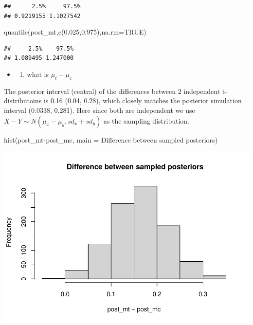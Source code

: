 \documentclass[
]{book}
\newenvironment{Shaded}{\begin{snugshade}}{\end{snugshade}}
\newcommand{\AttributeTok}[1]{\textcolor[rgb]{0.77,0.63,0.00}{#1}}
\newcommand{\ConstantTok}[1]{\textcolor[rgb]{0.00,0.00,0.00}{#1}}
\newcommand{\FloatTok}[1]{\textcolor[rgb]{0.00,0.00,0.81}{#1}}
\newcommand{\FunctionTok}[1]{\textcolor[rgb]{0.00,0.00,0.00}{#1}}
\newcommand{\NormalTok}[1]{#1}
\newcommand{\SpecialCharTok}[1]{\textcolor[rgb]{0.00,0.00,0.00}{#1}}
\newcommand{\StringTok}[1]{\textcolor[rgb]{0.31,0.60,0.02}{#1}}
\providecommand{\tightlist}{%
  \setlength{\itemsep}{0pt}\setlength{\parskip}{0pt}}
\theoremstyle{definition}
\theoremstyle{definition}
\theoremstyle{definition}
\theoremstyle{definition}
\theoremstyle{remark}
\begin{document}
\begin{verbatim}
##      2.5%     97.5% 
## 0.9219155 1.1027542
\end{verbatim}

\begin{Shaded}
\begin{Highlighting}[]
        \FunctionTok{quantile}\NormalTok{(post\_mt,}\FunctionTok{c}\NormalTok{(}\FloatTok{0.025}\NormalTok{,}\FloatTok{0.975}\NormalTok{),}\AttributeTok{na.rm=}\ConstantTok{TRUE}\NormalTok{)}
\end{Highlighting}
\end{Shaded}

\begin{verbatim}
##     2.5%    97.5% 
## 1.089495 1.247000
\end{verbatim}

\begin{itemize}
\item
  \begin{enumerate}
  \def\labelenumi{(\alph{enumi})}
  \setcounter{enumi}{1}
  \tightlist
  \item
    what is \(\mu_t - \mu_c\)
  \end{enumerate}
\end{itemize}

The posterior interval (central) of the differences between 2 independent t-distributoins is 0.16 (0.04, 0.28), which closely matches the posterior simulation interval (0.0338, 0.281). Here since both are independent we use \(X-Y\sim N(\mu_x-\mu_y, sd_x+sd_y)\) as the sampling distribution.

\begin{Shaded}
\begin{Highlighting}[]
 \FunctionTok{hist}\NormalTok{(post\_mt}\SpecialCharTok{{-}}\NormalTok{post\_mc, }\AttributeTok{main =} \StringTok{\textquotesingle{} Difference between sampled posteriors\textquotesingle{}}\NormalTok{)}
\end{Highlighting}
\end{Shaded}

\includegraphics{_main_files/figure-latex/unnamed-chunk-32-1.pdf}
\end{document}
